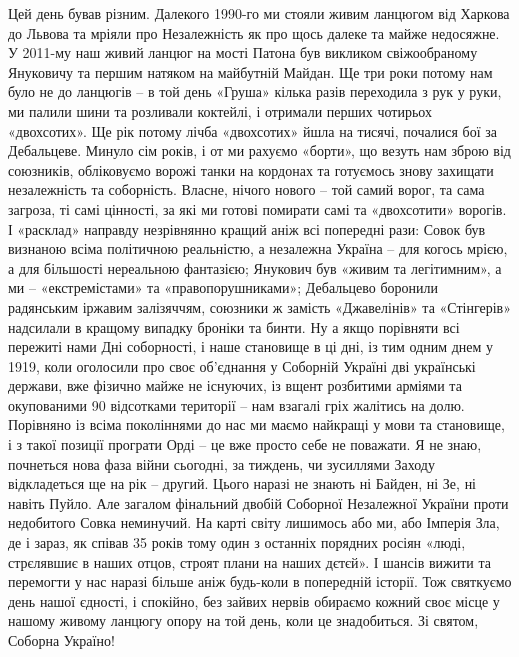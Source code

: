 Цей день бував різним. Далекого 1990-го ми стояли живим ланцюгом від Харкова до
Львова та мріяли про Незалежність як про щось далеке та майже недосяжне. У
2011-му наш живий ланцюг на мості Патона був викликом свіжообраному Януковичу
та першим натяком на майбутній Майдан. Ще три роки потому нам було не до
ланцюгів – в той день «Груша» кілька разів переходила з рук у руки, ми палили
шини та розливали коктейлі, і отримали перших чотирьох «двохсотих». Ще рік
потому лічба «двохсотих» йшла на тисячі, почалися бої за Дебальцеве. Минуло сім
років, і от ми рахуємо «борти», що везуть нам зброю від союзників, обліковуємо
ворожі танки на кордонах та готуємось знову захищати незалежність та
соборність. Власне, нічого нового – той самий ворог, та сама загроза, ті самі
цінності, за які ми готові помирати самі та «двохсотити» ворогів. І «расклад»
направду незрівнянно кращий аніж всі попередні рази: Совок був визнаною всіма
політичною реальністю, а незалежна Україна – для когось мрією, а для більшості
нереальною фантазією; Янукович був «живим та легітимним», а ми –
«екстремістами» та «правопорушниками»; Дебальцево боронили радянським іржавим
залізяччям, союзники ж замість «Джавелінів» та «Стінгерів» надсилали в кращому
випадку броніки та бинти. Ну а якщо порівняти всі пережиті нами Дні соборності,
і наше становище в ці дні, із тим одним днем у 1919, коли оголосили про своє
об’єднання у Соборній Україні дві українські держави, вже фізично майже не
існуючих, із вщент розбитими арміями та окупованими 90 відсотками території –
нам взагалі гріх жалітись на долю. Порівняно із всіма поколіннями до нас ми
маємо найкращі у мови та становище, і з такої позиції програти Орді – це вже
просто себе не поважати. Я не знаю, почнеться нова фаза війни сьогодні, за
тиждень, чи зусиллями Заходу відкладеться ще на рік – другий. Цього наразі не
знають ні Байден, ні Зе, ні навіть Пуйло. Але загалом фінальний двобій Соборної
Незалежної України проти недобитого Совка неминучий. На карті світу лишимось
або ми, або Імперія Зла, де і зараз, як співав 35 років тому один з останніх
порядних росіян «люді, стрєлявшиє в наших отцов, строят плани на наших дєтєй».
І шансів вижити та перемогти у нас наразі більше аніж будь-коли в попередній
історії. Тож святкуємо день нашої єдності, і спокійно, без зайвих нервів
обираємо кожний своє місце у нашому живому ланцюгу опору на той день, коли це
знадобиться. Зі святом, Соборна Україно!
